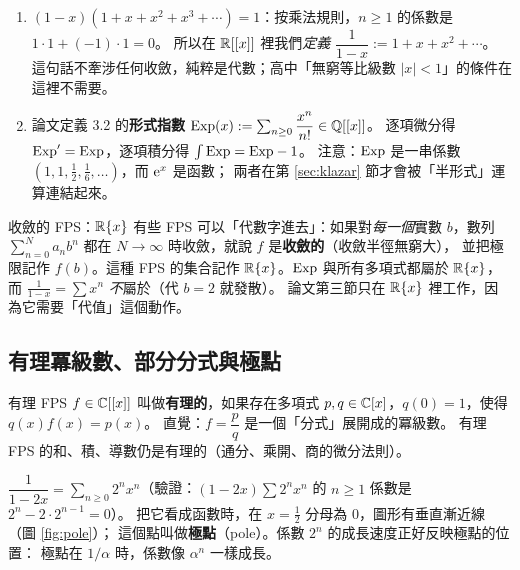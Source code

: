 \begin{exmp}[幾何級數與形式指數]
\begin{enumerate}
  \item $(1-x)(1+x+x^2+x^3+\cdots)=1$：按乘法規則，$n\ge1$ 的係數是 $1\cdot1+(-1)\cdot1=0$。
        所以在 $\mathbb{R}[[x]]$ 裡我們\emph{定義} $\dfrac{1}{1-x}:=1+x+x^2+\cdots$。
        這句話不牽涉任何收斂，純粹是代數；高中「無窮等比級數 $|x|<1$」的條件在這裡不需要。
  \item 論文定義 3.2 的\textbf{形式指數} $\mathrm{Exp}(x):=\sum_{n\ge0}\dfrac{x^n}{n!}\in\mathbb{Q}[[x]]$。
        逐項微分得 $\mathrm{Exp}'=\mathrm{Exp}$，逐項積分得 $\int\mathrm{Exp}=\mathrm{Exp}-1$。
        注意：$\mathrm{Exp}$ 是一串係數 $(1,1,\tfrac12,\tfrac16,\ldots)$，而 $\mathrm{e}^x$ 是函數；
        兩者在第 \ref{sec:klazar} 節才會被「半形式」運算連結起來。
\end{enumerate}
\end{exmp}

\begin{prereq}{收斂的 FPS：$\mathbb{R}\{x\}$}
有些 FPS 可以「代數字進去」：如果對\emph{每一個}實數 $b$，數列
$\sum_{n=0}^{N}a_nb^n$ 都在 $N\to\infty$ 時收斂，就說 $f$ 是\textbf{收斂的}（收斂半徑無窮大），
並把極限記作 $f(b)$。這種 FPS 的集合記作 $\mathbb{R}\{x\}$。$\mathrm{Exp}$ 與所有多項式都屬於 $\mathbb{R}\{x\}$，
而 $\frac1{1-x}=\sum x^n$ \emph{不}屬於（代 $b=2$ 就發散）。
論文第三節只在 $\mathbb{R}\{x\}$ 裡工作，因為它需要「代值」這個動作。
\end{prereq}

\subsection{有理冪級數、部分分式與極點}\label{sec:rational}

\begin{prereq}{有理 FPS}
$f\in\mathbb{C}[[x]]$ 叫做\textbf{有理的}，如果存在多項式 $p,q\in\mathbb{C}[x]$，$q(0)=1$，使得 $q(x)f(x)=p(x)$。
直覺：$f=\dfrac{p}{q}$ 是一個「分式」展開成的冪級數。
有理 FPS 的和、積、導數仍是有理的（通分、乘開、商的微分法則）。
\end{prereq}

\begin{exmp}\label{ex:pole}
$\dfrac{1}{1-2x}=\sum_{n\ge0}2^nx^n$（驗證：$(1-2x)\sum2^nx^n$ 的 $n\ge1$ 係數是 $2^n-2\cdot2^{n-1}=0$）。
把它看成函數時，在 $x=\tfrac12$ 分母為 $0$，圖形有垂直漸近線（圖 \ref{fig:pole}）；
這個點叫做\textbf{極點}（pole）。係數 $2^n$ 的成長速度正好反映極點的位置：
極點在 $1/\alpha$ 時，係數像 $\alpha^n$ 一樣成長。
\end{exmp}

